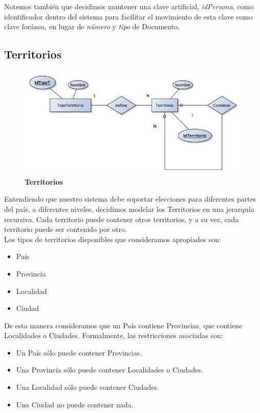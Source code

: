 Notemos también que decidimos mantener una clave artificial, \textit{idPersona}, como identificador dentro del sistema para facilitar el movimiento de esta clave como clave foránea, en lugar de \textit{número} y \textit{tipo} de Documento.\\

\subsection{Territorios}
\begin{figure}[H]
   \begin{center}
   \includegraphics[scale=0.5]{graphics/der_territorios.png}
   \caption{\textbf{Territorios}}
   \label{fig:der}
   \end{center}
\end{figure}

Entendiendo que nuestro sistema debe soportar elecciones para diferentes partes del país, a diferentes niveles, decidimos modelar los Territorios en una jerarquía recursiva. Cada territorio puede contener otros territorios, y a su vez, cada territorio puede ser contenido por otro.\\

Los tipos de territorios disponibles que consideramos apropiados son:
\begin{itemize}
	\item{País}
	\item{Provincia}
	\item{Localidad}
	\item{Ciudad}
\end{itemize}

De esta manera consideramos que un País contiene Provincias, que contiene Localidades o Ciudades. Formalmente, las restricciones asociadas son:
\begin{itemize}
	\item{Un País sólo puede contener Provincias.}
	\item{Una Provincia sólo puede contener Localidades o Ciudades.}
	\item{Una Localidad sólo puede contener Ciudades.}
	\item{Una Ciudad no puede contener nada.}
\end{itemize}

